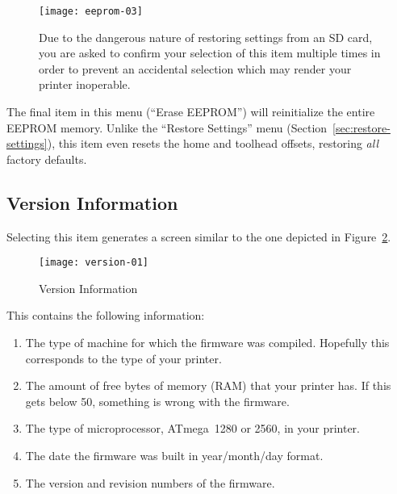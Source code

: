 \begin{figure}[!htbp]
  \centering
    \texttt{[image: eeprom-03]}
    \caption{Due to the dangerous nature of restoring settings from an SD card, you are asked to confirm your selection of this item multiple times in order to prevent an accidental selection which may render your printer inoperable.}
  \label{fig:three}
\end{figure}

The final item in this menu (``Erase EEPROM'') will reinitialize the entire EEPROM memory.  Unlike the ``Restore Settings'' menu (Section~\ref{sec:restore-settings}), this item even resets the home and toolhead offsets, restoring \emph{all} factory defaults.


\subsection{Version Information} \label{sec:versinf}

Selecting this item generates a screen similar to the one depicted in Figure~\ref{fig:vi}. 

\begin{figure}[!htbp]
  \centering
    \texttt{[image: version-01]}
    \caption{Version Information}
  \label{fig:vi}
\end{figure}

This contains the following information:

\begin{enumerate}
\item The type of machine for which the firmware was compiled.  Hopefully this corresponds to the type of your printer.
\item The amount of free bytes of memory (RAM) that your printer has.  If this gets below 50, something is wrong with the firmware.
\item The type of microprocessor, ATmega~1280 or 2560, in your printer.
\item The date the firmware was built in year/month/day format.
\item The version and revision numbers of the firmware.
\end{enumerate}
